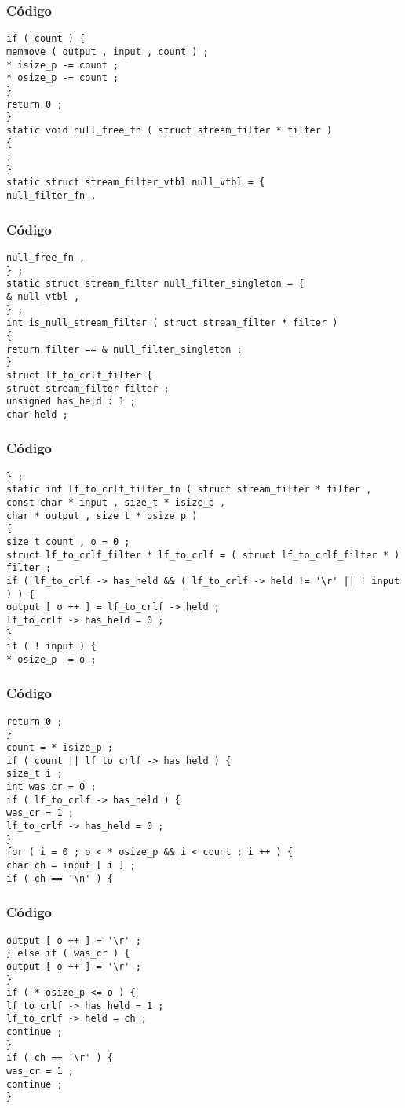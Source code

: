 \documentclass{beamer}
\begin{document}
\begin{frame}[fragile]
\frametitle{C\'odigo}
\begin{verbatim}
if ( count ) { 
memmove ( output , input , count ) ; 
* isize_p -= count ; 
* osize_p -= count ; 
} 
return 0 ; 
} 
static void null_free_fn ( struct stream_filter * filter ) 
{ 
; 
} 
static struct stream_filter_vtbl null_vtbl = { 
null_filter_fn , 
\end{verbatim}
\end{frame}
\begin{frame}[fragile]
\frametitle{C\'odigo}
\begin{verbatim}
null_free_fn , 
} ; 
static struct stream_filter null_filter_singleton = { 
& null_vtbl , 
} ; 
int is_null_stream_filter ( struct stream_filter * filter ) 
{ 
return filter == & null_filter_singleton ; 
} 
struct lf_to_crlf_filter { 
struct stream_filter filter ; 
unsigned has_held : 1 ; 
char held ; 
\end{verbatim}
\end{frame}
\begin{frame}[fragile]
\frametitle{C\'odigo}
\begin{verbatim}
} ; 
static int lf_to_crlf_filter_fn ( struct stream_filter * filter , 
const char * input , size_t * isize_p , 
char * output , size_t * osize_p ) 
{ 
size_t count , o = 0 ; 
struct lf_to_crlf_filter * lf_to_crlf = ( struct lf_to_crlf_filter * ) filter ; 
if ( lf_to_crlf -> has_held && ( lf_to_crlf -> held != '\r' || ! input ) ) { 
output [ o ++ ] = lf_to_crlf -> held ; 
lf_to_crlf -> has_held = 0 ; 
} 
if ( ! input ) { 
* osize_p -= o ; 
\end{verbatim}
\end{frame}
\begin{frame}[fragile]
\frametitle{C\'odigo}
\begin{verbatim}
return 0 ; 
} 
count = * isize_p ; 
if ( count || lf_to_crlf -> has_held ) { 
size_t i ; 
int was_cr = 0 ; 
if ( lf_to_crlf -> has_held ) { 
was_cr = 1 ; 
lf_to_crlf -> has_held = 0 ; 
} 
for ( i = 0 ; o < * osize_p && i < count ; i ++ ) { 
char ch = input [ i ] ; 
if ( ch == '\n' ) { 
\end{verbatim}
\end{frame}
\begin{frame}[fragile]
\frametitle{C\'odigo}
\begin{verbatim}
output [ o ++ ] = '\r' ; 
} else if ( was_cr ) { 
output [ o ++ ] = '\r' ; 
} 
if ( * osize_p <= o ) { 
lf_to_crlf -> has_held = 1 ; 
lf_to_crlf -> held = ch ; 
continue ; 
} 
if ( ch == '\r' ) { 
was_cr = 1 ; 
continue ; 
} 
\end{verbatim}
\end{frame}
\end{document}
